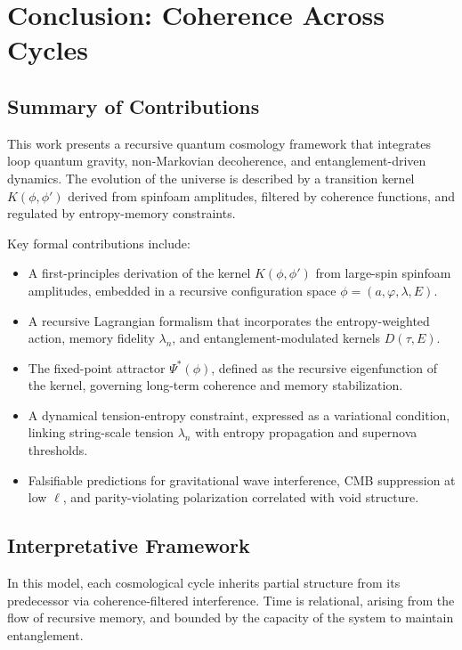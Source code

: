 \section{Conclusion: Coherence Across Cycles}
\label{sec:conclusion}

\subsection{Summary of Contributions}

This work presents a recursive quantum cosmology framework that integrates loop quantum gravity, non-Markovian decoherence, and entanglement-driven dynamics. The evolution of the universe is described by a transition kernel \( K(\phi, \phi') \) derived from spinfoam amplitudes, filtered by coherence functions, and regulated by entropy-memory constraints.

Key formal contributions include:
\begin{itemize}
    \item A first-principles derivation of the kernel \( K(\phi, \phi') \) from large-spin spinfoam amplitudes, embedded in a recursive configuration space \( \phi = (a, \varphi, \lambda, E) \).
    \item A recursive Lagrangian formalism that incorporates the entropy-weighted action, memory fidelity \( \lambda_n \), and entanglement-modulated kernels \( D(\tau, E) \).
    \item The fixed-point attractor \( \Psi^*(\phi) \), defined as the recursive eigenfunction of the kernel, governing long-term coherence and memory stabilization.
    \item A dynamical tension-entropy constraint, expressed as a variational condition, linking string-scale tension \( \lambda_n \) with entropy propagation and supernova thresholds.
    \item Falsifiable predictions for gravitational wave interference, CMB suppression at low \( \ell \), and parity-violating polarization correlated with void structure.
\end{itemize}

\subsection{Interpretative Framework}

In this model, each cosmological cycle inherits partial structure from its predecessor via coherence-filtered interference. Time is relational, arising from the flow of recursive memory, and bounded by the capacity of the system to maintain entanglement.

